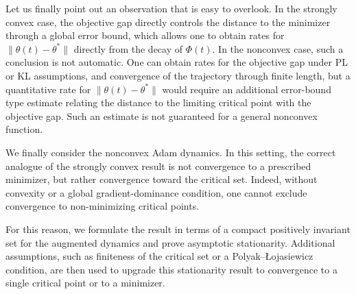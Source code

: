 \documentclass{article} %
\begin{document}
Let us finally point out an observation that is easy to overlook. In the strongly convex case, the objective gap directly controls the distance to the minimizer through a global error bound, which allows one to obtain rates for \(\|\theta(t)-\theta^*\|\) directly from the decay of \(\Phi(t)\). In the nonconvex case, such a conclusion is not automatic. One can obtain rates for the objective gap under PL or KL assumptions, and convergence of the trajectory through finite length, but a quantitative rate for \(\|\theta(t)-\theta^*\|\) would require an additional error-bound type estimate relating the distance to the limiting critical point with the objective gap. Such an estimate is not guaranteed for a general nonconvex function.

We finally consider the nonconvex Adam dynamics. In this setting, the correct analogue of the strongly convex result is not convergence to a prescribed minimizer, but rather convergence toward the critical set. Indeed, without convexity or a global gradient-dominance condition, one cannot exclude convergence to non-minimizing critical points.

For this reason, we formulate the result in terms of a compact positively invariant set for the augmented dynamics and prove asymptotic stationarity. Additional assumptions, such as finiteness of the critical set or a Polyak--Łojasiewicz condition, are then used to upgrade this stationarity result to convergence to a single critical point or to a minimizer.
\end{document}
